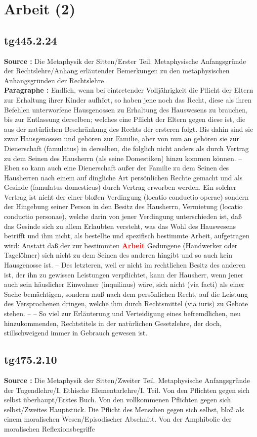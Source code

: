 \documentclass[a4paper,12pt,twoside]{book}
\newcommand{\match}[1]{\textcolor{red}{\textbf{#1}}}
\newcommand{\unnumberedsection}[1]{
	\section*{#1}
	\addcontentsline{toc}{section}{#1}
	\markright{#1}
}
\begin{document}
	\unnumberedsection{Arbeit (2)} 
	\subsection*{tg445.2.24} 
	\textbf{Source : }Die Metaphysik der Sitten/Erster Teil. Metaphysische Anfangsgründe der Rechtslehre/Anhang erläutender Bemerkungen zu den metaphysischen Anhangsgründen der Rechtslehre\\  
	
	\textbf{Paragraphe : }Endlich, wenn bei eintretender Volljährigkeit die Pflicht der Eltern zur Erhaltung ihrer Kinder aufhört, so haben jene noch das Recht, diese als ihren Befehlen unterworfene Hausgenossen zu Erhaltung des Hauswesens zu brauchen, bis zur Entlassung derselben; welches eine Pflicht der Eltern gegen diese ist, die aus der natürlichen Beschränkung des Rechts der ersteren folgt. Bis dahin sind sie zwar Hausgenossen und gehören zur Familie, aber von nun an gehören sie zur Dienerschaft (famulatus) in derselben, die folglich nicht anders als durch Vertrag zu dem Seinen des Hausherrn (als seine Domestiken) hinzu kommen können. – Eben so kann auch eine Dienerschaft 
	außer der Familie zu dem Seinen des Hausherren nach einem auf dingliche Art persönlichen Rechte gemacht und als Gesinde (famulatus domesticus) durch Vertrag erworben werden. Ein solcher Vertrag ist nicht der einer bloßen Verdingung (locatio conductio operae) sondern der Hingebung seiner Person in den Besitz des Hausherrn, Vermietung (locatio conductio personae), welche darin von jener Verdingung unterschieden ist, daß das Gesinde sich zu allem Erlaubten versteht, was das Wohl des Hauswesens betrifft und ihm nicht, als bestellte und spezifisch bestimmte Arbeit, aufgetragen wird: Anstatt daß der zur bestimmten \match{Arbeit} Gedungene (Handwerker oder Tagelöhner) sich nicht zu dem Seinen des anderen hingibt und so auch kein Hausgenosse ist. – Des letzteren, weil er nicht im rechtlichen Besitz des anderen ist, der ihn zu gewissen Leistungen verpflichtet, kann der Hausherr, wenn jener auch sein häuslicher Einwohner (inquilinus) wäre, sich nicht (via facti) als einer Sache bemächtigen, sondern muß nach dem persönlichen Recht, auf die Leistung des Versprochenen dringen, welche ihm durch Rechtsmittel (via iuris) zu Gebote stehen. – – So viel zur Erläuterung und Verteidigung eines befremdlichen, neu hinzukommenden, Rechtstitels in der natürlichen Gesetzlehre, der doch, stillschweigend immer in Gebrauch gewesen ist. 
	
	\subsection*{tg475.2.10} 
	\textbf{Source : }Die Metaphysik der Sitten/Zweiter Teil. Metaphysische Anfangsgründe der Tugendlehre/I. Ethische Elementarlehre/I. Teil. Von den Pflichten gegen sich selbst überhaupt/Erstes Buch. Von den vollkommenen Pflichten gegen sich selbst/Zweites Hauptstück. Die Pflicht des Menschen gegen sich selbst, bloß als einem moralischen Wesen/Episodischer Abschnitt. Von der Amphibolie der moralischen Reflexionsbegriffe\\  
	
\end{document}
